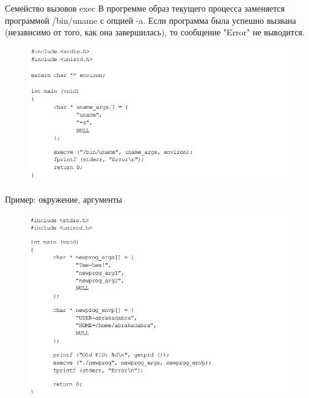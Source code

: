 \documentclass{beamer}
\begin{document}
\begin{frame}{Семейство вызовов exec}
В прогремме образ текущего процесса заменяется программой
/bin/uname с опцией -a. Если программа была успешно вызвана (независимо от того,
как она завершилась), то сообщение "Error" не выводится. 
\begin{figure}[h]
\centering
\includegraphics[scale=0.5]{images/lec07-pic36.png}
\end{figure}
\end{frame}

\begin{frame}{Пример: окружение, аргументы}
\begin{figure}[h]
\centering
\includegraphics[scale=0.5]{images/lec07-pic37.png}
\end{figure}
\end{frame}
\end{document}
